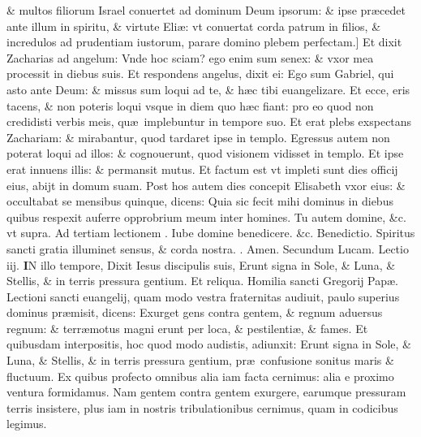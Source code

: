 \documentclass[a5paper,10pt]{book}
\def\ae{æ}
\begin{document}
\begin{multicols*}{2}
\& multos filiorum Israel conuertet ad dominum Deum ipsorum: \& ipse pr\ae cedet ante illum in spiritu, \& virtute Eli\ae : vt conuertat corda patrum in filios, \& incredulos ad prudentiam iustorum, parare domino plebem perfectam.]
Et dixit Zacharias ad angelum: Vnde hoc sciam? ego enim sum senex: \& vxor mea processit in diebus suis.
Et respondens angelus, dixit ei: Ego sum Gabriel, qui asto ante Deum: \& missus sum loqui ad te, \& h\ae c tibi euangelizare.
Et ecce, eris tacens, \& non poteris loqui vsque in diem quo h\ae c fiant: pro eo quod non credidisti verbis meis, qu\ae \ implebuntur in tempore suo.
Et erat plebs exspectans Zachariam: \& mirabantur, quod tardaret ipse in templo.
Egressus autem non poterat loqui ad illos: \& cognouerunt, quod visionem vidisset in templo.
Et ipse erat innuens illis: \& permansit mutus.
Et factum est vt impleti sunt dies officij eius, abijt in domum suam.
Post hos autem dies concepit Elisabeth vxor eius: \& occultabat se mensibus quinque, dicens: Quia sic fecit mihi dominus in diebus quibus respexit auferre opprobrium meum inter homines.
\newline Tu autem domine, \color{red} \&c. vt supra. \color{black}
\newline {} \color{red} Ad tertiam lectionem \Vbar . \color{black} Iube domine benedicere. \color{red} \&c. Benedictio. \color{black} Spiritus sancti gratia illuminet sensus, \& corda nostra. \color{red} \Rbar . \color{black} Amen.
\newline \color{red} Secundum Lucam. \hfill Lectio iij.\color{black}
\vspace{-1em}
\lettrine[lines=2]{\bfseries \color{red} I}{}N illo tempore, Dixit Iesus discipulis suis, Erunt signa in Sole, \& Luna, \& Stellis, \& in terris pressura gentium. \color{red} Et reliqua. \color{black}
\newline \color{red} Homilia sancti Gregorij Pap\ae . \color{black}
\newline \color{red} L\color{black}ectioni sancti euangelij, quam modo vestra fraternitas audiuit, paulo superius dominus pr\ae misit, dicens:
Exurget gens contra gentem, \& regnum aduersus regnum: \& terr\ae motus magni erunt per loca, \& pestilenti\ae , \& fames. 
Et quibusdam interpositis, hoc quod modo audistis, adiunxit: Erunt signa in Sole, \& Luna, \& Stellis, \& in terris pressura gentium, pr\ae \ confusione sonitus maris \& fluctuum.
Ex quibus profecto omnibus alia iam facta cernimus: alia e proximo ventura formidamus.
Nam gentem contra gentem exurgere, earumque pressuram terris insistere, plus iam in nostris tribulationibus cernimus, quam in codicibus legimus.

\end{multicols*}
\end{document}
